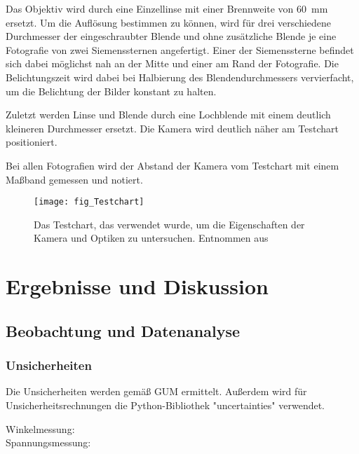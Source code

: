 \documentclass[
	a4paper,
	12pt,
	pagesize,
	ngerman
]{scrartcl}
\begin{document}
	Das Objektiv wird durch eine Einzellinse mit einer Brennweite von \SI{60}{\milli \meter} ersetzt.
	Um die 	Auflösung bestimmen zu können, wird für drei verschiedene Durchmesser der eingeschraubter Blende und ohne zusätzliche Blende je eine Fotografie von zwei Siemenssternen angefertigt.
	Einer der Siemenssterne befindet sich dabei möglichst nah an der Mitte und einer am Rand der Fotografie.
	Die Belichtungszeit wird dabei bei Halbierung des Blendendurchmessers vervierfacht, um die Belichtung der Bilder konstant zu halten.
	
	Zuletzt werden Linse und Blende durch eine Lochblende mit einem deutlich kleineren Durchmesser ersetzt. %
	Die Kamera wird deutlich näher am Testchart positioniert.
	
	Bei allen Fotografien wird der Abstand der Kamera vom Testchart mit einem Maßband gemessen und notiert.
	
	\begin{figure}[H] 
		\texttt{[image: fig\_Testchart]}
		\centering
		\caption{Das Testchart, das verwendet wurde, um die Eigenschaften der Kamera und Optiken zu untersuchen. Entnommen aus \cite{Testchart}} %
		\label{fig_testchart}
		\centering
	\end{figure}
	\section{Ergebnisse und Diskussion}
	

	\subsection{Beobachtung und Datenanalyse}
	\subsubsection{Unsicherheiten} %
Die Unsicherheiten werden gemäß GUM ermittelt. 
	Außerdem wird für Unsicherheitsrechnungen die Python-Bibliothek "uncertainties" verwendet.
	\begin{description}
		\item[Winkelmessung:] 
		\item[Spannungsmessung:] 
	\end{description}
\end{document}
